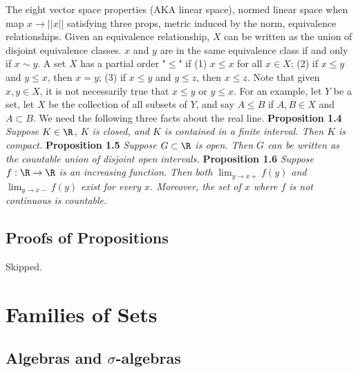 \begin{sloppypar}
\bigskip \newline \indent The eight vector space properties (AKA linear space), normed linear space when map $x \to ||x||$ satisfying three props, metric induced by the norm, equivalence relationships.
\newline \indent Given an equivalence relationship, $X$ can be written as the union of disjoint equivalence classes. $x$ and $y$ are in the same equivalence class if and only if $x \sim y$.
\bigskip \newline \indent A set $X$ has a partial order "$\leq$" if
\newline (1) $x \leq x$ for all $x \in X$;
\newline (2) if $x \leq y$ and $y \leq x$, then $x = y$;
\newline (3) if $x \leq y$ and $y \leq z$, then $x \leq z$.
\medskip \newline \indent Note that given $x,y \in X$, it is not necessarily true that $x \leq y$ or $y \leq x$. For an example, let $Y$ be a set, let $X$ be the collection of all subsets of $Y$, and say $A \leq B$ if $A,B \in X$ and $A \subset B$.
\medskip \newline \indent We need the following three facts about the real line.
\bigskip \newline \textbf{Proposition 1.4} \textit{Suppose $K \in \R$, $K$ is closed, and $K$ is contained in a finite interval. Then $K$ is compact.}
\bigskip \newline \textbf{Proposition 1.5} \textit{Suppose $G \subset \R$ is open. Then $G$ can be written as the countable union of disjoint open intervals.}
\bigskip \newline \textbf{Proposition 1.6} \textit{Suppose $f: \R \to \R$ is an increasing function. Then both $\lim_{y\to x+}f(y)$ and $\lim_{y\to x-} f(y)$ exist for every $x$. Moreover, the set of $x$ where $f$ is not continuous is countable.}

\section{Proofs of Propositions}

Skipped.

\chapter{Families of Sets}
\section{Algebras and $\sigma$-algebras}


\end{sloppypar}
